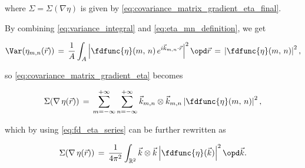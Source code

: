 {where $\Sigma = \Sigma(\nabla\eta)$ is given by \eqref{eq:covariance_matrix_gradient_eta_final}.
























\HRule

By combining \eqref{eq:variance_integral} and \eqref{eq:eta_mn_definition}, we get

\begin{equation} \label{eq:variance_integral_eta_mn}
\Var(\eta_{m,n}(\vec{r})) \,=\, \frac{1}{A}\int_A\left|\fdfunc{\eta}(m,\,n)\,e^{i\vec{k}_{m,n}\cdot\vec{r}}\right|^2\opd\vec{r} \,=\, \left|\fdfunc{\eta}(m,\,n)\right|^2,
\end{equation}

so \eqref{eq:covariance_matrix_gradient_eta} becomes

\begin{equation}
\displaystyle \Sigma(\nabla\,\eta(\vec{r})) \,=\, \sum_{m=-\infty}^{+\infty}\sum_{n=-\infty}^{+\infty}\vec{k}_{m,n}\otimes\vec{k}_{m,n} \left|\fdfunc{\eta}(m,\,n)\right|^2,
\end{equation}

which by using \eqref{eq:fd_eta_series} can be further rewritten as

\begin{equation}
\displaystyle \Sigma(\nabla\,\eta(\vec{r})) \,=\, \frac{1}{4\pi^2} \int_{\mathbb{R}^2}\vec{k}\otimes\vec{k} \left|\fdfunc{\eta}(\vec{k})\right|^2\opd\vec{k}.
\end{equation}




















































}
